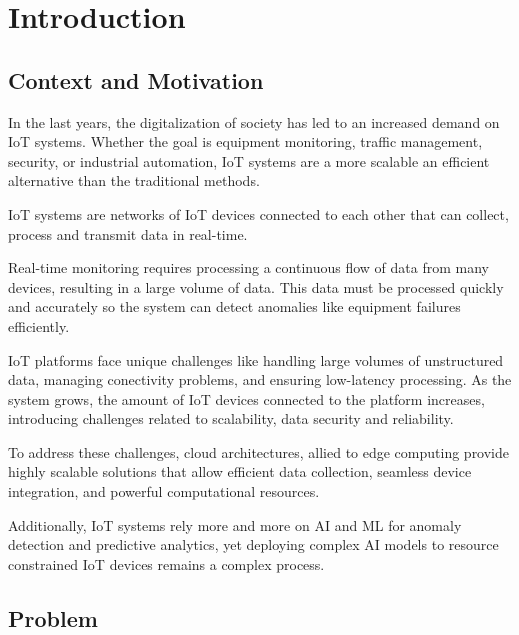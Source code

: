 
%

\chapter{Introduction}
\label{cha:introduction}

\section{Context and Motivation}
In the last years, the digitalization of society has led to an increased
demand on \gls{IoT} systems. Whether the goal is equipment monitoring, traffic
management, security, or industrial automation, \gls{IoT} systems are a more
scalable an efficient alternative than the traditional methods.

\gls{IoT} systems are networks of \gls{IoT} devices connected to each other
that can collect, process and transmit data in real-time.

Real-time monitoring requires processing a continuous flow of data from many
devices, resulting in a large volume of data. This data must be processed
quickly and accurately so the system can detect anomalies like equipment failures
efficiently.

IoT platforms face unique challenges like handling large volumes of
unstructured data, managing conectivity problems, and ensuring low-latency
processing. As the system grows, the amount of \gls{IoT} devices connected to
the platform increases, introducing challenges related to scalability, data
security and reliability.

To address these challenges, cloud architectures, allied to edge computing provide highly scalable solutions
that allow efficient data collection, seamless device integration, and powerful
computational resources.

Additionally, \gls{IoT} systems rely more and more on \gls{AI} and \gls{ML} for
anomaly detection and predictive analytics, yet deploying complex \gls{AI}
models to resource constrained \gls{IoT} devices remains a complex process.

\section{Problem}


